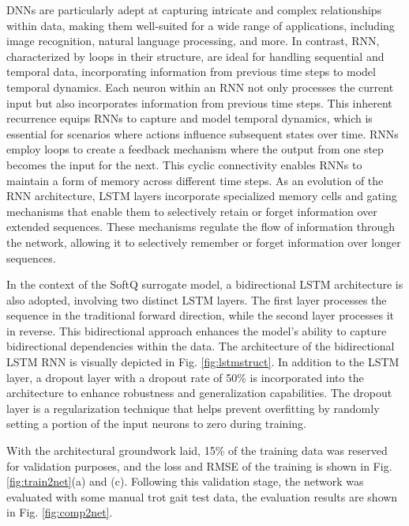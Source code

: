 DNNs are particularly adept at capturing intricate and complex relationships within data, making them well-suited for a wide range of applications, including image recognition, natural language processing, and more. In contrast, \ac{RNN}, characterized by loops in their structure, are ideal for handling sequential and temporal data, incorporating information from previous time steps to model temporal dynamics. Each neuron within an RNN not only processes the current input but also incorporates information from previous time steps. This inherent recurrence equips RNNs to capture and model temporal dynamics, which is essential for scenarios where actions influence subsequent states over time. RNNs employ loops to create a feedback mechanism where the output from one step becomes the input for the next. This cyclic connectivity enables RNNs to maintain a form of memory across different time steps. As an evolution of the RNN architecture, \ac{LSTM} layers incorporate specialized memory cells and gating mechanisms that enable them to selectively retain or forget information over extended sequences. These mechanisms regulate the flow of information through the network, allowing it to selectively remember or forget information over longer sequences.


In the context of the SoftQ surrogate model, a bidirectional LSTM architecture is also adopted, involving two distinct LSTM layers. The first layer processes the sequence in the traditional forward direction, while the second layer processes it in reverse. This bidirectional approach enhances the model's ability to capture bidirectional dependencies within the data. The architecture of the bidirectional LSTM RNN is visually depicted in Fig. \ref{fig:lstmstruct}. In addition to the LSTM layer, a dropout layer with a dropout rate of 50\% is incorporated into the architecture to enhance robustness and generalization capabilities. The dropout layer is a regularization technique that helps prevent overfitting by randomly setting a portion of the input neurons to zero during training.

With the architectural groundwork laid, 15\% of the training data was reserved for validation purposes, and the loss and \ac{RMSE} of the training is shown in Fig. \ref{fig:train2net}(a) and (c). Following this validation stage, the network was evaluated with some manual trot gait test data, the evaluation results are shown in Fig. \ref{fig:comp2net}.

